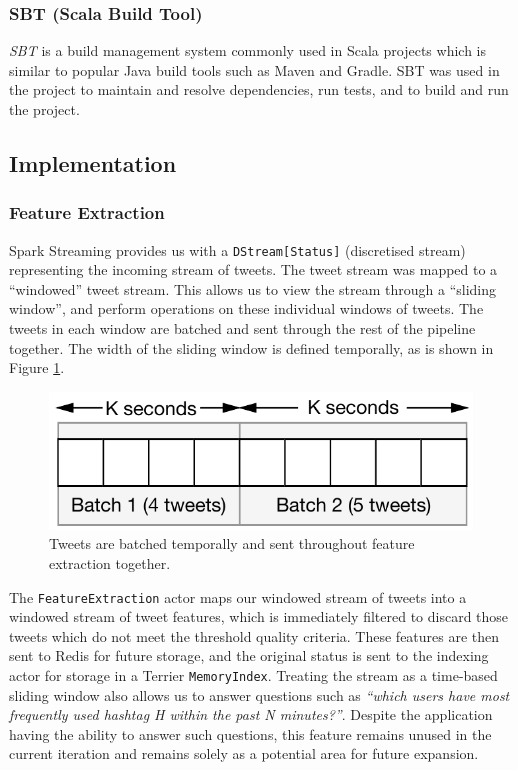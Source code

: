 \documentclass{l4proj}
\newcommand{\code}[1]{\texttt{#1}}
\begin{document}
             \subsubsection{SBT (Scala Build Tool)}
         \textit{SBT} is a build management system commonly used in Scala projects which is similar to popular Java build tools such as Maven and Gradle. SBT was used in the project to maintain and resolve dependencies, run tests, and to build and run the project.

    
    \subsection{Implementation}
    
    \subsubsection{Feature Extraction}
        
        Spark Streaming provides us with a \code{DStream[Status]} (discretised stream) representing the incoming stream of tweets. The tweet stream was mapped to a ``windowed'' tweet stream. This allows us to view the stream through a ``sliding window'', and perform operations on these individual windows of tweets. The tweets in each window are batched and sent through the rest of the pipeline together. The width of the sliding window is defined temporally, as is shown in Figure \ref{slidingwindow}.
        
\begin{figure}
\centering
\includegraphics[scale=0.8]{slidingwindow.pdf}
\caption{Tweets are batched temporally and sent throughout feature extraction together.}
\label{slidingwindow}
\end{figure}

        The \code{FeatureExtraction} actor maps our windowed stream of tweets into a windowed stream of tweet features, which is immediately filtered to discard those tweets which do not meet the threshold quality criteria. These features are then sent to Redis for future storage, and the original status is sent to the indexing actor for storage in a Terrier \code{MemoryIndex}.
                Treating the stream as a time-based sliding window also allows us to answer questions such as \textit{``which users have most frequently used hashtag H within the past N minutes?''}. Despite the application having the ability to answer such questions, this feature remains unused in the current iteration and remains solely as a potential area for future expansion. 
        
\end{document}
